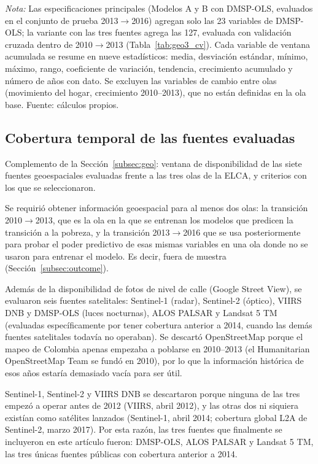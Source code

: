 \documentclass[12pt, letterpaper]{article}
\begin{document}
\begin{table}[H]
\begin{minipage}{0.95\textwidth}
    \footnotesize \textit{Nota:} Las especificaciones principales (Modelos
    A y B con DMSP-OLS, evaluados en el conjunto de prueba 2013$\to$2016)
    agregan solo las 23 variables de
    DMSP-OLS; la variante con las tres fuentes agrega las 127, evaluada con
    validación cruzada dentro de 2010$\to$2013 (Tabla~\ref{tab:geo3_cv}).
    Cada variable de ventana acumulada se resume en nueve estadísticos:
    media, desviación estándar, mínimo, máximo, rango, coeficiente de
    variación, tendencia, crecimiento acumulado y número de años con dato.
    Se excluyen las variables de cambio entre olas (movimiento del hogar,
    crecimiento 2010--2013), que no están definidas en la ola base. Fuente:
    cálculos propios.
  \end{minipage}
\end{table}

\subsection{Cobertura temporal de las fuentes evaluadas}
\label{apx:cobertura_temporal}

Complemento de la Sección~\ref{subsec:geo}: ventana de disponibilidad de
las siete fuentes geoespaciales evaluadas frente a las tres olas de la
ELCA, y criterios con los que se seleccionaron.

Se requirió obtener información geoespacial para al menos dos olas:
la transición 2010$\to$2013, que es la ola en la que se entrenan los modelos que
predicen la transición a la pobreza, y la transición 2013$\to$2016 que se usa posteriormente para
probar el poder predictivo de esas mismas variables en una ola
donde no se usaron para entrenar el modelo. Es decir,
fuera de muestra (Sección~\ref{subsec:outcome}).

Además de la disponibilidad de fotos de nivel de calle (Google Street View),
se evaluaron seis fuentes satelitales: Sentinel-1 (radar),
Sentinel-2 (óptico), VIIRS DNB y DMSP-OLS (luces nocturnas), ALOS PALSAR
y Landsat 5 TM (evaluadas específicamente por tener cobertura anterior
a 2014, cuando las demás fuentes satelitales todavía no operaban). Se descartó
OpenStreetMap porque el mapeo de Colombia apenas empezaba a
poblarse en 2010--2013 (el Humanitarian OpenStreetMap Team se fundó en
2010), por lo que la información histórica de esos años estaría
demasiado vacía para ser útil.

Sentinel-1, Sentinel-2 y VIIRS DNB se
descartaron porque ninguna de las tres empezó a operar antes de
2012 (VIIRS, abril 2012), y las otras dos ni siquiera existían como
satélites lanzados (Sentinel-1, abril 2014; cobertura global L2A de
Sentinel-2, marzo 2017). Por esta razón, las tres fuentes que finalmente se
incluyeron en este artículo fueron: DMSP-OLS, ALOS PALSAR y Landsat 5 TM, las tres
únicas fuentes públicas con cobertura anterior a 2014.
\end{document}
